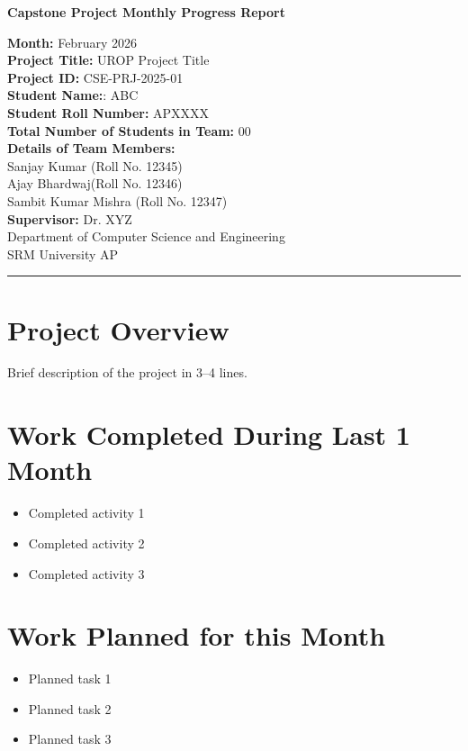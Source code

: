 \documentclass[12pt,a4paper]{article}
\begin{document}
\begin{center}
    \Large \textbf{  Capstone Project Monthly Progress Report}\\[0.5cm]
    \normalsize
    
    \textbf{Month:} February 2026 \\[0.5cm]
    \textbf{Project Title:} UROP Project Title  \\[0.5cm]
    \textbf{Project ID:} CSE-PRJ-2025-01 \\[0.5cm]
    \textbf{Student Name:}: ABC \\
    \textbf{Student Roll Number:} APXXXX\\

    \textbf{Total Number of Students in Team:} 00 \\
    \textbf{Details of  Team Members:}\\
    Sanjay Kumar (Roll No. 12345)\\
       Ajay Bhardwaj(Roll No. 12346)\\
    Sambit Kumar Mishra (Roll No. 12347)\\[0.5cm]
    \textbf{Supervisor:} Dr. XYZ \\[0.5cm]
    Department of Computer Science and Engineering\\
    SRM University AP
\end{center}

\hrule
\vspace{1cm}

\section{Project Overview}
Brief description of the project in 3–4 lines.

\section{Work Completed During Last 1 Month}
\begin{itemize}[leftmargin=*]
    \item Completed activity 1
    \item Completed activity 2
    \item Completed activity 3
\end{itemize}

\section{Work Planned for this Month}
\begin{itemize}[leftmargin=*]
    \item Planned task 1
    \item Planned task 2
    \item Planned task 3
\end{itemize}
\end{document}
